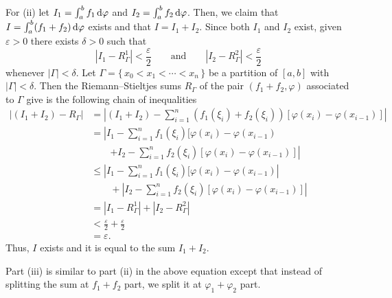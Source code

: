 \begin{solution}
  For (ii) let \(I_1=\int_a^b f_1\mathop{}\!\mathrm{d}\varphi\) and
  \(I_2=\int_a^b f_2\mathop{}\!\mathrm{d}\varphi\). Then, we claim that
  \(I=\int_a^b (f_1+f_2)\mathop{}\!\mathrm{d}\varphi\) exists and that \(I=I_1+I_2\). Since
  both \(I_1\) and \(I_2\) exist, given \(\varepsilon>0\) there exists
  \(\delta>0\) such that
  \[
    |I_1-R_\Gamma^1|<\frac{\varepsilon}{2}\qquad\text{and}\qquad
    |I_2-R_\Gamma^2|<\frac{\varepsilon}{2}
  \]
  whenever \(|\Gamma|<\delta\). Let \(\Gamma=\{\,x_0<x_1<\cdots<x_n\,\}\)
  be a partition of \([a,b]\) with \(|\Gamma|<\delta\). Then the
  Riemann--Stieltjes sums \(R_\Gamma\) of the pair \((f_1+f_2,\varphi)\)
  associated to \(\Gamma\) give is the following chain of inequalities
  \begin{align*}
    |(I_1+I_2)-R_{\Gamma}|
    &=\left|(I_1+I_2)
      -\sum_{i=1}^n (f_1(\xi_i)+f_2(\xi_i))[\varphi(x_i)-\varphi(x_{i-1})]
      \right|\\
    &=\left|
      I_1
      -\sum_{i=1}^n
      f_1(\xi_i)[\varphi(x_i)-\varphi(x_{i-1})\right.\\
    &\qquad
      \left.+I_2
      -\sum_{i=1}^n f_2(\xi_i)[\varphi(x_i)-\varphi(x_{i-1})]\right|\\
    &\leq
      \left|
      I_1
      -\sum_{i=1}^n
      f_1(\xi_i)[\varphi(x_i)-\varphi(x_{i-1})
      \right|\\
    &\qquad
      +\left|
      I_2-\sum_{i=1}^n f_2(\xi_i)[\varphi(x_i)-\varphi(x_{i-1})]\right|\\
    &=|I_1-R_\Gamma^1|+|I_2-R_\Gamma^2|\\
    &<\frac{\varepsilon}{2}+\frac{\varepsilon}{2}\\
    &=\varepsilon.
  \end{align*}
  Thus, \(I\) exists and it is equal to the sum \(I_1+I_2\).

  Part (iii) is similar to part (ii) in the above equation except that
  instead of splitting the sum at \(f_1+f_2\) part, we split it at
  \(\varphi_1+\varphi_2\) part.
\end{solution}

